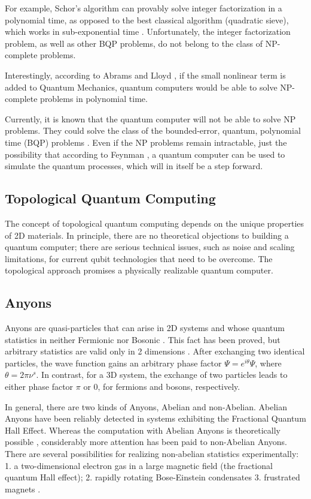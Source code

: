 For example, Schor's algorithm \cite{Schor} can provably solve integer factorization in a polynomial time, as opposed to the best classical algorithm (quadratic sieve), which works in sub-exponential time \cite{Pomerance}. Unfortunately, the integer factorization problem, as well as other BQP problems, do not belong to the class of NP-complete problems. 

Interestingly, according to Abrams and Lloyd \cite{Abrams_1998}, \cite{Abrams_1999} if the small nonlinear term is added to Quantum Mechanics, quantum computers would be able to solve NP-complete problems in polynomial time.

Currently, it is known that the quantum computer will not be able to solve NP problems. They could solve the class of the bounded-error, quantum, polynomial time (BQP) problems \cite{BQP}. 
Even if the NP problems remain intractable, just the possibility that according to Feynman \cite{FQC}, a quantum computer can be used to simulate the quantum processes, which will in itself be a step forward. 

\subsection*{Topological Quantum Computing}
The concept of topological quantum computing \cite{Tqc1}
depends on the unique properties of 2D materials.  In principle, there are no theoretical objections to building a quantum computer; there are serious technical issues, such as noise and scaling limitations, for current qubit technologies that need to be overcome\cite{QCProblems}. 
The topological approach promises a physically realizable quantum computer\cite{Tqc2,Tqc3}. 

\subsection*{Anyons}
Anyons are quasi-particles that can arise in 2D systems and whose quantum statistics in neither Fermionic nor Bosonic \cite{Anyons1}.  This fact has been proved\cite{Anyons2}, but
arbitrary statistics are valid only in 2 dimensions \cite{Walsh}. After exchanging two identical particles, the wave function gains an arbitrary phase factor $ \Psi = e^{i\theta}\Psi $, where $ \theta = 2\pi\nu^{s} $. In contrast, for a 3D system, the exchange of two particles leads to either phase factor $ \pi $ or $ 0 $, for fermions and bosons, respectively.

In general, there are two kinds of Anyons, Abelian and non-Abelian. Abelian Anyons have been reliably detected in systems exhibiting the Fractional Quantum Hall Effect\cite{FQHE}.  Whereas the computation with Abelian Anyons is theoretically possible \cite{AbelianAnyons}, considerably more attention has been paid to non-Abelian Anyons.
There are several possibilities for realizing non-abelian statistics experimentally: 1. a two-dimensional electron gas in a large magnetic field (the fractional quantum Hall effect); 2. rapidly rotating Bose-Einstein condensates\cite{RrBeC} 3. frustrated magnets \cite{FrMag}.

